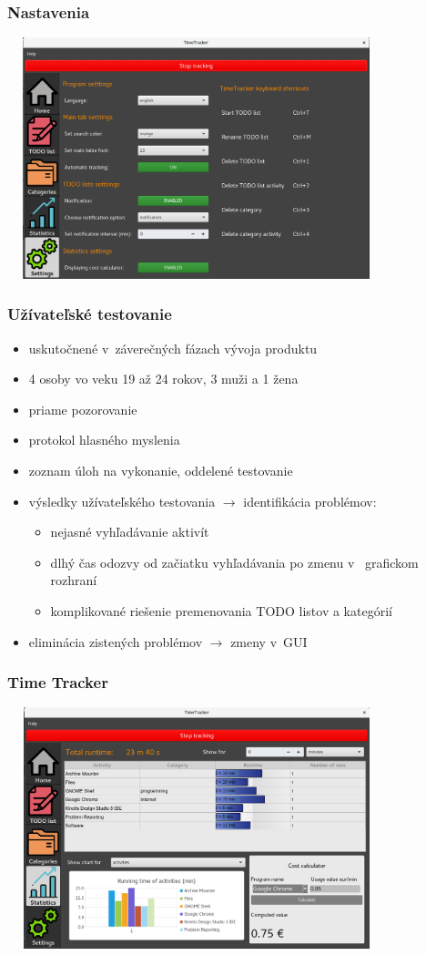 \documentclass[10pt,xcolor=pdflatex]{beamer}
\begin{document}
\begin{frame}
\frametitle{Nastavenia}
\includegraphics[width=11cm, height=7cm]{settings}
\end{frame}

\begin{frame}
	\frametitle{Užívateľské testovanie}
	\begin{itemize}
		\item uskutočnené v~záverečných fázach vývoja produktu
		\item 4 osoby vo veku 19 až 24 rokov, 3 muži a 1 žena
		\item priame pozorovanie
		\item protokol hlasného myslenia
		\item zoznam úloh na vykonanie, oddelené testovanie
		\item výsledky užívateľského testovania $\rightarrow$ identifikácia problémov:
		\begin{itemize}
			\item nejasné vyhľadávanie aktivít
			\item dlhý čas odozvy od začiatku vyhľadávania po zmenu v~ grafickom rozhraní
			\item komplikované riešenie premenovania TODO listov a kategórií
		\end{itemize}
		\item eliminácia zistených problémov $\rightarrow$ zmeny v~GUI
	\end{itemize}
\end{frame}

\begin{frame}
\frametitle{Time Tracker}
\includegraphics[width=11cm, height=7cm]{statistics}
\end{frame}
\end{document}
